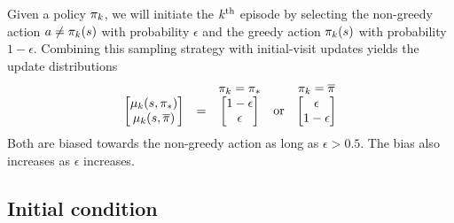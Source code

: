 Given a policy $\pi_k$, we will initiate the $k^{\textup{th}}$ episode by selecting the non-greedy action $a \neq \pi_k(s)$ with probability $\epsilon$ and the greedy action $\pi_k(s)$ with probability $1-\epsilon$.
Combining this sampling strategy with initial-visit updates yields the update distributions
\begin{align}
    \begin{array}{lcccc}
    & & \pi_k = {\pi}_* & & \pi_k = \overline{\pi}
    \\
    \begin{bmatrix}
        \mu_k(s, {\pi}_*)
        \\
        \mu_k(s, \overline{\pi})
    \end{bmatrix}
    &
    =
    &
    \begin{bmatrix}
        1-\epsilon
        \\
        \epsilon
    \end{bmatrix}
    & 
    \text{or}
    &
    \begin{bmatrix}
        \epsilon
        \\
        1 - \epsilon
    \end{bmatrix}
    \end{array}
\end{align}
Both are biased towards the non-greedy action as long as $\epsilon > 0.5$.
The bias also increases as $\epsilon$ increases.


\subsection{Initial condition}

\vspace{-0.2cm}




